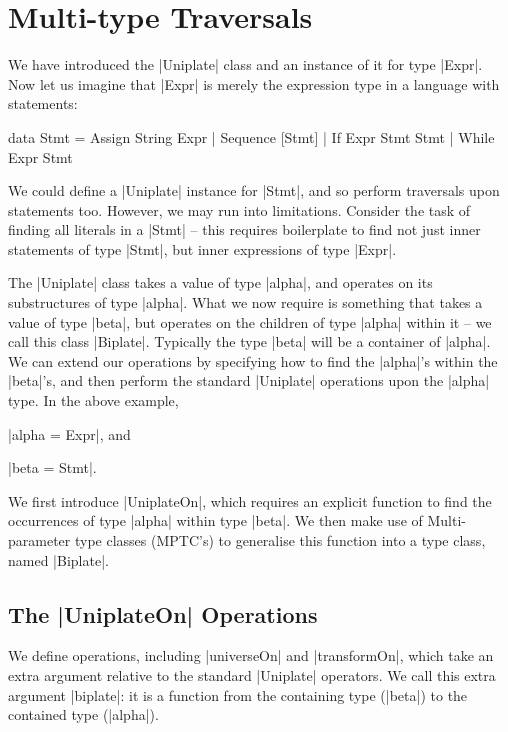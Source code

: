 \section{Multi-type Traversals}
\label{secU:use_playex}

We have introduced the |Uniplate| class and an instance of it for type |Expr|. Now let us imagine that |Expr| is merely the expression type in a language with statements:

\begin{onepage}
\begin{code}
data Stmt  =  Assign    String  Expr
           |  Sequence  [Stmt]
           |  If        Expr    Stmt Stmt
           |  While     Expr    Stmt
\end{code}
\end{onepage}

We could define a |Uniplate| instance for |Stmt|, and so perform traversals upon statements too. However, we may run into limitations. Consider the task of finding all literals in a |Stmt| -- this requires boilerplate to find not just inner statements of type |Stmt|, but inner expressions of type |Expr|.

The |Uniplate| class takes a value of type |alpha|, and operates on its substructures of type |alpha|. What we now require is something that takes a value of type |beta|, but operates on the children of type |alpha| within it -- we call this class |Biplate|. Typically the type |beta| will be a container of |alpha|. We can extend our operations by specifying how to find the |alpha|'s within the |beta|'s, and then perform the standard |Uniplate| operations upon the |alpha| type. In the above example, \ignore|alpha = Expr|, and \ignore|beta = Stmt|.

We first introduce |UniplateOn|, which requires an explicit function to find the occurrences of  type |alpha| within type |beta|. We then make use of Multi-parameter type classes (MPTC's) to generalise this function into a type class, named |Biplate|.

\subsection{The |UniplateOn| Operations}

We define operations, including |universeOn| and |transformOn|, which take an extra argument relative to the standard |Uniplate| operators. We call this extra argument |biplate|: it is a function from the containing type (|beta|) to the contained type (|alpha|).

